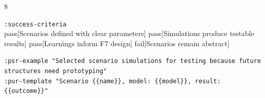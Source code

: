 \documentclass[landscape]{article}
\newenvironment{devmapgreenfield}{%
  \def\FrameCommand{\colorbox{devmapgreenfieldbg}}%
  \setlength{\fboxsep}{2pt}%
  \MakeFramed{\advance\hsize-\width \FrameRestore}%
}{\endMakeFramed}
\begin{document}
\begin{paracol}{8}
\begin{devmapgreenfield}
\par
  \texttt{:\allowbreak{}success-\allowbreak{}criteria}\\
    pass[Scenarios defined with clear parameters] pass[Simulations produce testable results] pass[Learnings inform F7 design] fail[Scenarios remain abstract]\\
\par
  \texttt{:\allowbreak{}psr-\allowbreak{}example "Selected scenario simulations for testing because future structures need prototyping"}\\
  \texttt{:\allowbreak{}pur-\allowbreak{}template "Scenario \{\{name\}\},\allowbreak{} model:\allowbreak{} \{\{model\}\},\allowbreak{} result:\allowbreak{} \{\{outcome\}\}"}\\
\end{devmapgreenfield}

\end{paracol}
\end{document}
